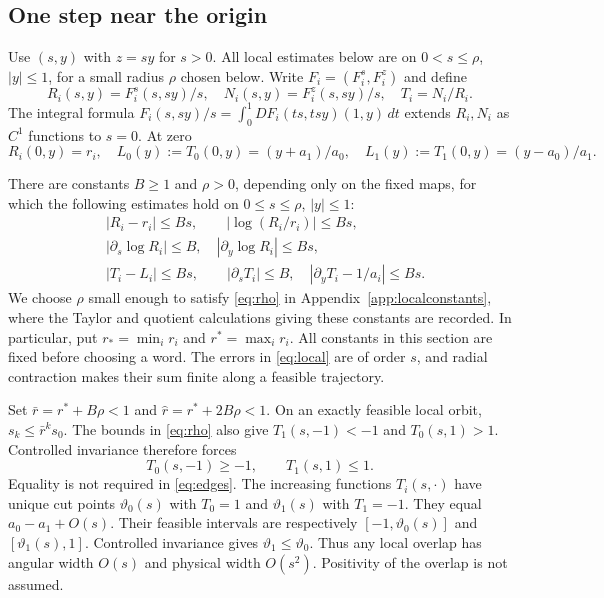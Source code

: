 \documentclass[11pt]{amsart}
\theoremstyle{definition}
\theoremstyle{remark}
\numberwithin{equation}{section}
\begin{document}
\subsection{One step near the origin}
Use \((s,y)\) with \(z=sy\) for \(s>0\). All local estimates
below are on \(0<s\le\rho\), \(|y|\le1\), for a small radius
$\rho$ chosen below. Write $F_i=(F_i^s,F_i^z)$ and define
\[
 R_i(s,y)=F_i^s(s,sy)/s,\quad
 N_i(s,y)=F_i^z(s,sy)/s,\quad T_i=N_i/R_i.
\]
The integral formula
\(F_i(s,sy)/s=\int_0^1DF_i(ts,tsy)(1,y)\,dt\)
extends \(R_i,N_i\) as \(C^1\) functions to \(s=0\).
At zero
\begin{equation}
R_i(0,y)=r_i,\quad
 L_0(y):=T_0(0,y)=(y+a_1)/a_0,\quad
 L_1(y):=T_1(0,y)=(y-a_0)/a_1.                                \label{eq:limangular}
\end{equation}

There are constants $B\ge1$ and $\rho>0$, depending only on the
fixed maps, for which the following estimates hold on
$0\le s\le\rho$, $|y|\le1$:
\begin{equation}
\begin{split}
 &|R_i-r_i|\le Bs,\qquad |\log(R_i/r_i)|\le Bs,\\
 &|\partial_s\log R_i|\le B,
          \quad |\partial_y\log R_i|\le Bs,\\
 &|T_i-L_i|\le Bs,\qquad |\partial_sT_i|\le B,
          \quad |\partial_yT_i-1/a_i|\le Bs .                 \label{eq:local}
\end{split}
\end{equation}
We choose $\rho$ small enough to satisfy \eqref{eq:rho} in
Appendix~\ref{app:localconstants}, where the Taylor and quotient
calculations giving these constants are recorded. In particular,
put $r_* =\min_i r_i$ and $r^*=\max_i r_i$. All constants in
this section are fixed before choosing a word. The errors in
\eqref{eq:local} are of order $s$, and radial contraction makes
their sum finite along a feasible trajectory.

Set \(\bar r=r^*+B\rho<1\) and
\(\widehat r=r^*+2B\rho<1\). On an exactly feasible local orbit,
\(s_k\le\bar r^ks_0\). The bounds in \eqref{eq:rho} also give
\(T_1(s,-1)<-1\) and \(T_0(s,1)>1\). Controlled invariance therefore
forces
\begin{equation}
T_0(s,-1)\ge-1,\qquad T_1(s,1)\le1.       \label{eq:edges}
\end{equation}
Equality is not required in \eqref{eq:edges}.
The increasing functions \(T_i(s,\cdot)\) have unique cut points
\(\vartheta_0(s)\) with \(T_0=1\) and \(\vartheta_1(s)\) with
\(T_1=-1\). They equal \(a_0-a_1+O(s)\).
Their feasible intervals are respectively
\([-1,\vartheta_0(s)]\) and \([\vartheta_1(s),1]\).
Controlled invariance gives \(\vartheta_1\le\vartheta_0\).
Thus any local overlap has angular width \(O(s)\) and physical
width \(O(s^2)\). Positivity of the overlap is not assumed.
\end{document}
